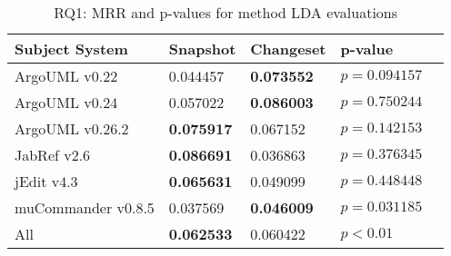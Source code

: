 
\begin{table}[t]
\renewcommand{\arraystretch}{1.3}
\footnotesize
\centering
\caption{RQ1: MRR and p-values for method LDA evaluations}
\begin{tabular}{l|ll|ll}
   \toprule
    Subject System & Snapshot & Changeset & p-value  \\
    \midrule

ArgoUML v0.22 & 0.044457 & {\bf 0.073552 } & $p = 0.094157$ \\
ArgoUML v0.24 & 0.057022 & {\bf 0.086003 } & $p = 0.750244$ \\
ArgoUML v0.26.2 & {\bf 0.075917 } & 0.067152 & $p = 0.142153$ \\
JabRef v2.6 & {\bf 0.086691 } & 0.036863 & $p = 0.376345$ \\
jEdit v4.3 & {\bf 0.065631 } & 0.049099 & $p = 0.448448$ \\
muCommander v0.8.5 & 0.037569 & {\bf 0.046009 } & $p = 0.031185$ \\
\midrule
All & {\bf 0.062533 } & 0.060422 & $p < 0.01$ \\

    \bottomrule
\end{tabular}
\label{table:rq1:method:lda}
\end{table}

